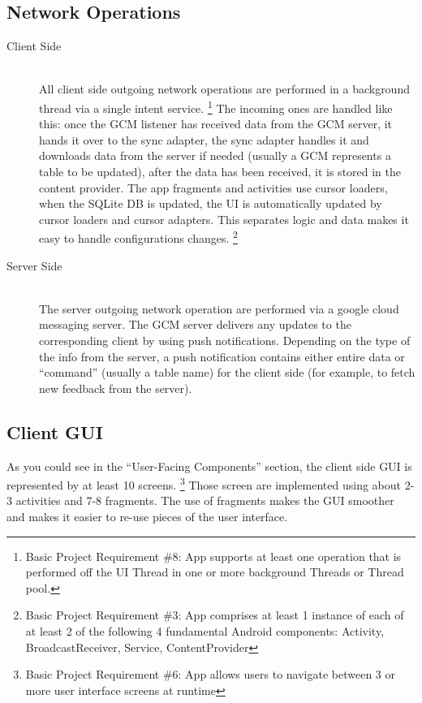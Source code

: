 \documentclass{article}
\begin{document}
    \subsection{Network Operations}

    \begin{description}
        \item[Client Side] \hfill \\
        All client side outgoing network operations are performed in a background thread via a single intent service.
        \footnote{Basic Project Requirement \#8: App supports at least one operation that is performed off the UI Thread in one or more background Threads or Thread pool.}
        The incoming ones are handled like this: once the GCM listener has received data from the GCM server, it hands it over to the sync adapter, the sync adapter handles it and downloads data from the server if needed (usually a GCM represents a table to be updated), after the data has been received, it is stored in the content provider. The app fragments and activities use cursor loaders, when the SQLite DB is updated, the UI is automatically updated by cursor loaders and cursor adapters.
        This separates logic and data makes it easy to handle configurations changes.
        \footnote{Basic Project Requirement \#3: App comprises at least 1 instance of each of at least 2 of the following 4 fundamental Android components: Activity, BroadcastReceiver, Service, ContentProvider}
        \item[Server Side] \hfill \\
            The server outgoing network operation are performed via a google cloud messaging server. The GCM server delivers any updates to the corresponding client by using push notifications. Depending on the type of the info from the server, a push notification contains either entire data or ``command'' (usually a table name) for the client side (for example, to fetch new feedback from the server).
    \end{description}

    \subsection{Client GUI}

    As you could see in the ``User-Facing Components'' section, the client side GUI is represented by at least 10 screens.
    \footnote{Basic Project Requirement \#6: App allows users to navigate between 3 or more user interface screens at runtime}
    Those screen are implemented using about 2-3 activities and 7-8 fragments. The use of fragments makes the GUI smoother and makes it easier to re-use pieces of the user interface.
\end{document}
